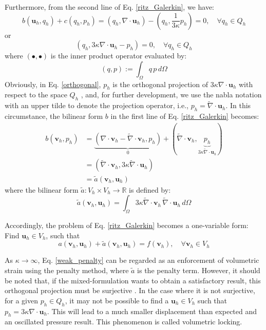 Furthermore, from the second line of Eq. \eqref{ritz_Galerkin}, we have:
\begin{equation}
b(\boldsymbol{u}_h, q_h) + c(q_h, p_h) = (q_h, \nabla \cdot \boldsymbol{u}_h) - (q_h, \frac{1}{3\kappa} p_h) = 0, \quad \forall q_h \in Q_h
\end{equation}
or
\begin{equation}\label{orthogonal}
(q_h, 3\kappa \nabla \cdot \boldsymbol{u}_h - p_h) = 0, \quad \forall q_h \in Q_h
\end{equation}
where $(\bullet, \bullet)$ is the inner product operator evaluated by:
\begin{equation}
(q, p) := \int_\Omega q \, p \, d\Omega
\end{equation}
Obviously, in Eq. \eqref{orthogonal}, $p_h$ is the orthogonal projection of $3\kappa \nabla \cdot \boldsymbol{u}_h$ with respect to the space $Q_h$ \cite{brezzi1991}, and, for further development, we use the nabla notation with an upper tilde to denote the projection operator, i.e., $p_h = \tilde{\nabla} \cdot \boldsymbol{u}_h$. In this circumstance, the bilinear form $b$ in the first line of Eq. \eqref{ritz_Galerkin} becomes:
\begin{equation}
\begin{split}
b(\boldsymbol{v}_h, p_h) &= \underbrace{(\nabla \cdot \boldsymbol{v}_h - \tilde{\nabla} \cdot \boldsymbol{v}_h, p_h)}_{0} + (\tilde{\nabla} \cdot \boldsymbol{v}_h, \underbrace{p_h}_{3\kappa \tilde \nabla \cdot \boldsymbol u_h}) \\
&= (\tilde{\nabla} \cdot \boldsymbol{v}_h, 3\kappa \tilde{\nabla} \cdot \boldsymbol{u}_h) \\
&= \tilde{a}(\boldsymbol{v}_h, \boldsymbol{u}_h)
\end{split}
\end{equation}
where the bilinear form $\tilde{a}: V_h \times V_h \rightarrow \mathbb{R}$ is defined by:
\begin{equation}
\tilde{a}(\boldsymbol{v}_h, \boldsymbol{u}_h) = \int_\Omega 3\kappa \tilde{\nabla} \cdot \boldsymbol{v}_h \, \tilde{\nabla} \cdot \boldsymbol{u}_h \, d\Omega
\end{equation}

Accordingly, the problem of Eq. \eqref{ritz_Galerkin} becomes a one-variable form:
Find $\boldsymbol{u}_h \in V_h$, such that
\begin{equation}\label{weak_penalty}
a(\boldsymbol{v}_h, \boldsymbol{u}_h) + \tilde{a}(\boldsymbol{v}_h, \boldsymbol{u}_h) = f(\boldsymbol{v}_h), \quad \forall \boldsymbol{v}_h \in V_h
\end{equation}

As $\kappa \rightarrow \infty$, Eq. \eqref{weak_penalty} can be regarded as an enforcement of volumetric strain using the penalty method, where $\tilde{a}$ is the penalty term. However, it should be noted that, if the mixed-formulation wants to obtain a satisfactory result, this orthogonal projection must be surjective \cite{stein2004}. In the case where it is not surjective, for a given $p_h \in Q_h$, it may not be possible to find a $\boldsymbol{u}_h \in V_h$ such that $p_h = 3\kappa \nabla \cdot \boldsymbol{u}_h$. This will lead to a much smaller displacement than expected and an oscillated pressure result. This phenomenon is called volumetric locking.